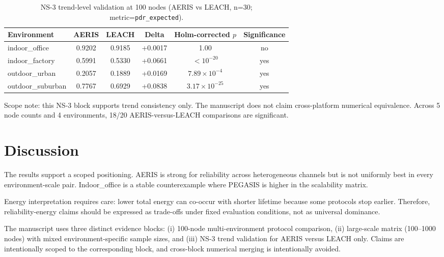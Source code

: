 \documentclass[sensors,article,submit,moreauthors,pdftex]{Definitions/mdpi}
\begin{document}
\begin{table}[H]
\caption{NS-3 trend-level validation at 100 nodes (AERIS vs LEACH, n=30; metric=\texttt{pdr\_expected}).}
\label{tab:ns3_trend}
\centering
\begin{tabular}{lccccc}
\toprule
Environment & AERIS & LEACH & Delta & Holm-corrected $p$ & Significance \\
\midrule
indoor\_office    & 0.9202 & 0.9185 & +0.0017 & 1.00 & no \\
indoor\_factory   & 0.5991 & 0.5330 & +0.0661 & $<10^{-20}$ & yes \\
outdoor\_urban    & 0.2057 & 0.1889 & +0.0169 & $7.89\times10^{-4}$ & yes \\
outdoor\_suburban & 0.7767 & 0.6929 & +0.0838 & $3.17\times10^{-25}$ & yes \\
\bottomrule
\end{tabular}
\end{table}

Scope note: this NS-3 block supports trend consistency only. The manuscript does not claim cross-platform numerical equivalence. Across 5 node counts and 4 environments, 18/20 AERIS-versus-LEACH comparisons are significant.

\section{Discussion}
The results support a scoped positioning. AERIS is strong for reliability across heterogeneous channels but is not uniformly best in every environment-scale pair. Indoor\_office is a stable counterexample where PEGASIS is higher in the scalability matrix.

Energy interpretation requires care: lower total energy can co-occur with shorter lifetime because some protocols stop earlier. Therefore, reliability-energy claims should be expressed as trade-offs under fixed evaluation conditions, not as universal dominance.

The manuscript uses three distinct evidence blocks: (i) 100-node multi-environment protocol comparison, (ii) large-scale matrix (100--1000 nodes) with mixed environment-specific sample sizes, and (iii) NS-3 trend validation for AERIS versus LEACH only. Claims are intentionally scoped to the corresponding block, and cross-block numerical merging is intentionally avoided.
\end{document}
